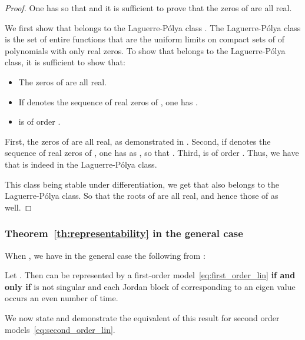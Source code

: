 \documentclass{article}
\begin{document}
\begin{proof}
One has 
so that  and it is sufficient to prove that the zeros of  are all real. 

We first show that  belongs to the Laguerre-Pólya class \cite{craven2002iterated}. The Laguerre-Pólya class is the set of entire functions that are the uniform limits on compact sets of  of polynomials with only real zeros. To show that  belongs to the Laguerre-Pólya class, it is sufficient to show \citep[p. 22]{dryanov1999approximation} that:
\begin{itemize}
    \item The zeros of  are all real.
    \item If  denotes the sequence of real zeros of , one has .
    \item  is of order .
\end{itemize}
First, the zeros of  are all real, as demonstrated in \citet{runckel1969zeros}. Second, if  denotes the sequence of real zeros of , one has  as , so that . Third,  is of order .
Thus, we have that  is indeed in the Laguerre-Pólya class.

This class being stable under differentiation, we get that  also belongs to the Laguerre-Pólya class. So that the roots of  are all real, and hence those of  as well.

\end{proof}
\subsubsection{Theorem~\ref{th:representability} in the general case}

When , we have in the general case the following from \citet{culver1966existence}:

Let . Then  can be represented by a first-order model~\eqref{eq:first_order_lin} \textbf{if and only if}  is not singular and each Jordan block of  corresponding to an eigen value   occurs an even number of time. 

We now state and demonstrate the equivalent of this result for second order models~\eqref{eq:second_order_lin}.
\end{document}
